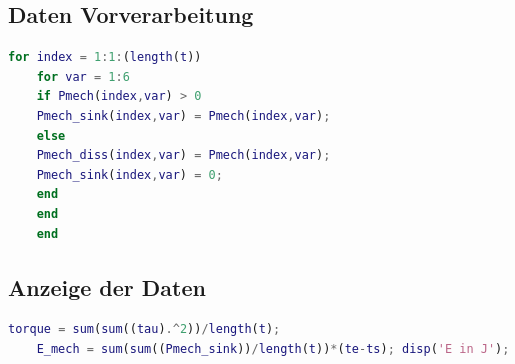 \subsection{Daten Vorverarbeitung}
%
\begin{lstlisting}[language=Matlab, numbers=none]
	for index = 1:1:(length(t))
	for var = 1:6
	if Pmech(index,var) > 0
	Pmech_sink(index,var) = Pmech(index,var);
	else
	Pmech_diss(index,var) = Pmech(index,var);
	Pmech_sink(index,var) = 0;
	end
	end
	end
\end{lstlisting}
%
\subsection{Anzeige der Daten}
%
\begin{lstlisting}[language=Matlab, numbers=none]
	torque = sum(sum((tau).^2))/length(t);
	E_mech = sum(sum((Pmech_sink))/length(t))*(te-ts); disp('E in J'); disp(E_mech);
\end{lstlisting}
%
%
\setcounter{chapter}{4}
\setcounter{section}{0}
\setcounter{table}{0}
\setcounter{figure}{0}
